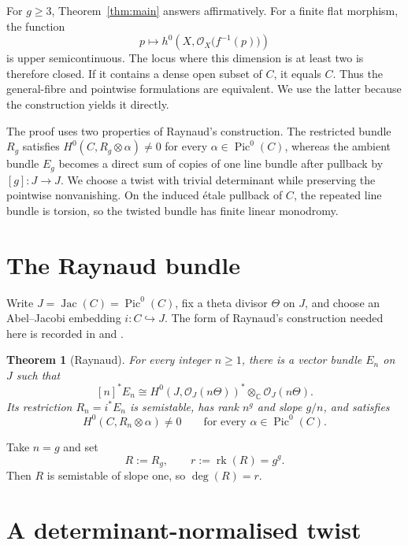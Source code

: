 \documentclass[10pt,a4paper,reqno]{amsart}
\newtheorem{theorem}{Theorem}[section]
\theoremstyle{remark}
\newcommand{\CC}{\mathbb{C}}
\newcommand{\OO}{\mathcal{O}}
\newcommand{\tens}{\otimes}
\DeclareMathOperator{\Pic}{Pic}
\DeclareMathOperator{\Jac}{Jac}
\DeclareMathOperator{\rk}{rk}
\begin{document}
For $g\geq 3$, Theorem~\ref{thm:main} answers
\cite[Problem~14]{LittProblem14} affirmatively.  For a finite flat morphism,
the function
\[
  p\longmapsto h^0\!\left(X,\OO_X\bigl(f^{-1}(p)\bigr)\right)
\]
is upper semicontinuous.  The locus where this dimension is at least two is
therefore closed.  If it contains a dense open subset of $C$, it equals $C$.
Thus the general-fibre and pointwise formulations are equivalent.  We use the
latter because the construction yields it directly.

The proof uses two properties of Raynaud's construction.  The restricted
bundle $R_g$ satisfies $H^0(C,R_g\tens\alpha)\neq0$ for every
$\alpha\in\Pic^0(C)$, whereas the ambient bundle $E_g$ becomes a direct sum
of copies of one line bundle after pullback by $[g]\colon J\to J$.  We choose
a twist with trivial determinant while preserving the pointwise
nonvanishing.  On the induced \'{e}tale pullback of $C$, the repeated line
bundle is torsion, so the twisted bundle has finite linear monodromy.

\section{The Raynaud bundle}

Write $J=\Jac(C)=\Pic^0(C)$, fix a theta divisor $\Theta$ on $J$, and choose
an Abel--Jacobi embedding $i\colon C\hookrightarrow J$.  The form of Raynaud's
construction needed here is recorded in \cite[Section~3]{Raynaud} and
\cite[Section~2.3]{Beauville}.

\begin{theorem}[Raynaud]\label{thm:raynaud}
For every integer $n\geq 1$, there is a vector bundle $E_n$ on $J$ such that
\begin{equation}\label{eq:raynaud-pullback}
  [n]^*E_n
  \cong H^0\!\left(J,\OO_J(n\Theta)\right)^*\tens_{\CC}\OO_J(n\Theta).
\end{equation}
Its restriction $R_n=i^*E_n$ is semistable, has rank $n^g$ and slope $g/n$,
and satisfies
\begin{equation}\label{eq:raynaud-nonvanishing}
  H^0(C,R_n\tens\alpha)\neq 0
  \qquad\text{for every }\alpha\in\Pic^0(C).
\end{equation}
\end{theorem}

Take $n=g$ and set
\[
  R:=R_g,
  \qquad
  r:=\rk(R)=g^g.
\]
Then $R$ is semistable of slope one, so $\deg(R)=r$.

\section{A determinant-normalised twist}
\end{document}
